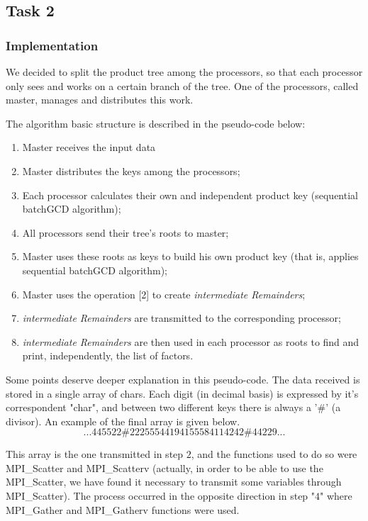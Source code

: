 \documentclass[a4paper,12pt]{article}
\begin{document}



\subsection{Task 2}

\subsubsection{Implementation}
We decided to split the product tree among the processors, so that each processor only sees and works on a certain branch of the tree. One of the processors, called master, manages and distributes this work.

The algorithm basic structure is described in the pseudo-code below:

\begin{enumerate}
    \item Master receives the input data
    \item Master distributes the keys among the processors;
   \item Each processor calculates their own and independent product key (sequential batchGCD algorithm);
    \item All processors send their tree's roots to master;
    \item Master uses these roots as keys to build his own product key (that is, applies sequential batchGCD algorithm);
    \item Master uses the operation [2] to create \textit{intermediate Remainders};
    \item \textit{intermediate Remainders} are transmitted to the corresponding processor;
    \item \textit{intermediate Remainders} are then used in each processor as roots to find and print, independently, the list of factors.
\end{enumerate}

Some points deserve deeper explanation in this pseudo-code. The data received is stored in a single array of chars. Each digit (in decimal basis) is expressed by it's correspondent "char", and between two different keys there is always a '\#' (a divisor). An example of the final array is given below.
$$...445522 \# 22255544194155584114242 \# 44229...$$

This array is the one transmitted in step $2$, and the functions used to do so were MPI\_Scatter and MPI\_Scatterv (actually, in order to be able to use the MPI\_Scatter, we have found it necessary to transmit some variables through MPI\_Scatter). The process occurred in the opposite direction in step "$4$" where MPI\_Gather and MPI\_Gatherv functions were used.
\end{document}
